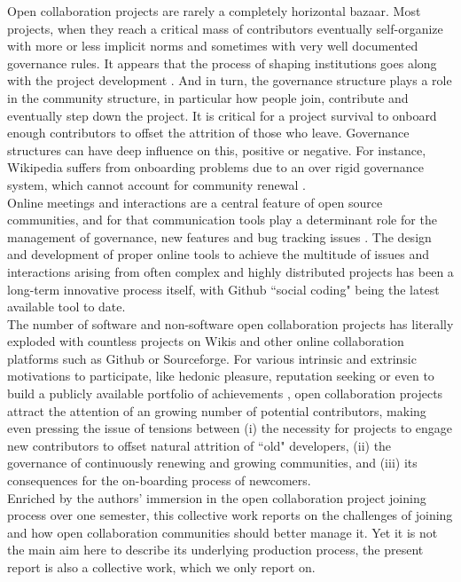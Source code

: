 \noindent Open collaboration projects are rarely a completely horizontal bazaar. Most projects, when they reach a critical mass of contributors eventually self-organize with more or less implicit norms and sometimes with very well documented governance rules. It appears that the process of shaping institutions goes along with the project development \cite{O'Mahony2007}. And in turn, the governance structure plays a role in the community structure, in particular how people join, contribute and eventually step down the project. It is critical for a project survival to onboard enough contributors to offset the attrition of those who leave. Governance structures can have deep influence on this, positive or negative. For instance, Wikipedia suffers from onboarding problems due to an over rigid governance system, which cannot account for community renewal \cite{halfaker2013}.\\

\noindent Online meetings and interactions are a central feature of open source communities, and for that communication tools play a determinant role \cite{kuk2006strategic} for the management of governance, new features and bug tracking issues \cite{lomi2013}. The design and development of proper online tools to achieve the multitude of issues and interactions arising from often complex and highly distributed projects has been a long-term innovative process itself, with Github ``social coding" being the latest available tool to date.\\

\noindent The number of software and non-software open collaboration projects has literally exploded with countless projects on Wikis and other online collaboration platforms such as Github or Sourceforge. For various intrinsic and extrinsic motivations to participate, like hedonic pleasure, reputation seeking or even to build a publicly available portfolio of achievements \cite{hars2001}, open collaboration projects attract the attention of an growing number of potential contributors, making even pressing the issue of tensions between (i) the necessity for projects to engage new contributors to offset natural attrition of ``old" developers, (ii)  the governance of continuously  renewing and growing communities, and (iii) its consequences for the on-boarding process of newcomers.\\

\noindent Enriched by the authors' immersion in the open collaboration project joining process over one semester, this collective work reports on the challenges of joining and how open collaboration communities should better manage it. Yet it is not the main aim here to describe its underlying production process,  the present report is also a collective work, which we only report on. 

